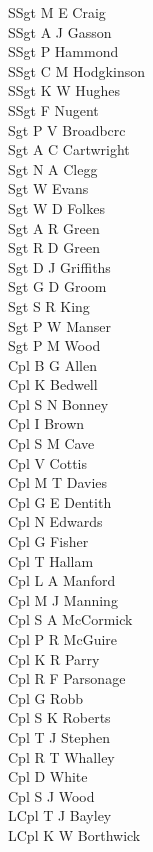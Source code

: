 \begin{multicols}{3}
  \small
  \noindent
  SSgt M E Craig \\
  SSgt A J Gasson \\
  SSgt P Hammond \\
  SSgt C M Hodgkinson \\
  SSgt K W Hughes \\
  SSgt F Nugent \\
  Sgt P V Broadbcrc \\
  Sgt A C Cartwright \\
  Sgt N A Clegg \\
  Sgt W Evans \\
  Sgt W D Folkes \\
  Sgt A R Green \\
  Sgt R D Green \\
  Sgt D J Griffiths \\
  Sgt G D Groom \\
  Sgt S R King \\
  Sgt P W Manser \\
  Sgt P M Wood \\
  Cpl B G Allen \\
  Cpl K Bedwell \\
  Cpl S N Bonney \\
  Cpl I Brown \\
  Cpl S M Cave \\
  Cpl V Cottis \\
  Cpl M T Davies \\
  Cpl G E Dentith \\
  Cpl N Edwards \\
  Cpl G Fisher \\
  Cpl T Hallam \\
  Cpl L A Manford \\
  Cpl M J Manning \\
  Cpl S A McCormick \\
  Cpl P R McGuire \\
  Cpl K R Parry \\
  Cpl R F Parsonage \\
  Cpl G Robb \\
  Cpl S K Roberts \\
  Cpl T J Stephen \\
  Cpl R T Whalley \\
  Cpl D White \\
  Cpl S J Wood \\
  LCpl T J Bayley \\
  LCpl K W Borthwick \\

\end{multicols}
